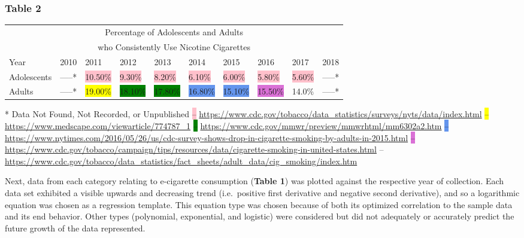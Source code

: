 \subsubsection*{Table 2}

\begin{center}
    \begin{tabular}{p{1in} p{0.45in} p{0.45in} p{0.45in} p{0.45in} p{0.45in} p{0.45in} p{0.45in} p{0.45in} p{0.45in}}
        \toprule
        \multicolumn{10}{c}{Percentage of Adolescents and Adults}\\
        \multicolumn{10}{c}{who Consistently Use Nicotine Cigarettes}\\    
        \midrule
        Year & 2010 & 2011 & 2012 & 2013 & 2014 & 2015 & 2016 & 2017 & 2018 \\
        \midrule
        Adolescents & -----* & \colorbox{pink}{10.50\%} & \colorbox{pink}{9.30\%} & \colorbox{pink}{8.20\%} & \colorbox{pink}{6.10\%} & \colorbox{pink}{6.00\%} & \colorbox{pink}{5.80\%} & \colorbox{pink}{5.60\%} & -----* \\
        Adults & -----* & \colorbox{yellow}{19.00\%} & \colorbox{green}{18.10\%} & \colorbox{green}{17.80\%} & \colorbox{CornflowerBlue}{16.80\%} & \colorbox{CornflowerBlue}{15.10\%} & \colorbox{Orchid}{15.50\%} & \colorbox{Emerald}{14.0\%} & -----* \\
        \bottomrule
    \end{tabular}
\end{center}
%
* Data Not Found, Not Recorded, or Unpublished
\newline
\colorbox{pink}{--} \url{https://www.cdc.gov/tobacco/data_statistics/surveys/nyts/data/index.html}
\newline
\colorbox{yellow}{--} \url{https://www.medscape.com/viewarticle/774787_1}
\newline
\colorbox{green}{--} \url{https://www.cdc.gov/mmwr/preview/mmwrhtml/mm6302a2.htm}
\newline
\colorbox{CornflowerBlue}{--} \url{https://www.nytimes.com/2016/05/26/us/cdc-survey-shows-drop-in-cigarette-smoking-by-adults-in-2015.html}
\newline
\colorbox{Orchid}{--} \url{https://www.cdc.gov/tobacco/campaign/tips/resources/data/cigarette-smoking-in-united-states.html}
\newline
\colorbox{Emerald}{--} \url{https://www.cdc.gov/tobacco/data_statistics/fact_sheets/adult_data/cig_smoking/index.htm}

Next, data from each category relating to e-cigarette consumption (\textbf{Table 1}) was plotted against the respective year of collection. Each data set exhibited a visible upwards and decreasing trend (i.e.\ positive first derivative and negative second derivative), and so a logarithmic equation was chosen as a regression template. This equation type was chosen because of both its optimized correlation to the sample data and its end behavior. Other types (polynomial, exponential, and logistic) were considered but did not adequately or accurately predict the future growth of the data represented.

